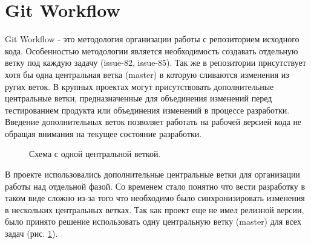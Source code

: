 \section{Git Workflow}
Git Workflow - это методология организации работы с репозиторием исходного кода.
Особенностью методологии является необходимость создавать отдельную ветку под
каждую задачу (issue-82, issue-85). Так же в репозитории присутствует хотя бы
одна центральная ветка (master) в которую сливаются изменения из ругих веток. В
крупных проектах могут присутствовать дополнительные центральные ветки,
предназначенные для объединения изменений перед тестированием продукта или
объединения изменений в процессе разработки. Введение дополнительных веток
позволяет работать на рабочей версией кода не обращая внимания на текущее
состояние разработки.

\begin{figure}[h]
\caption{Схема с одной центральной веткой.}
\label{ris:one_central_branch}
\end{figure}

В проекте использовались дополнительные центральные ветки для организации работы
над отдельной фазой. Со временем стало понятно что вести разработку в таком виде
сложно из-за того что необходимо было синхронизировать изменения в нескольких
центральных ветках. Так как проект еще не имел релизной версии, было принято
решение использовать одну центральную ветку (master) для всех задач (рис.
\ref{ris:one_central_branch}).

